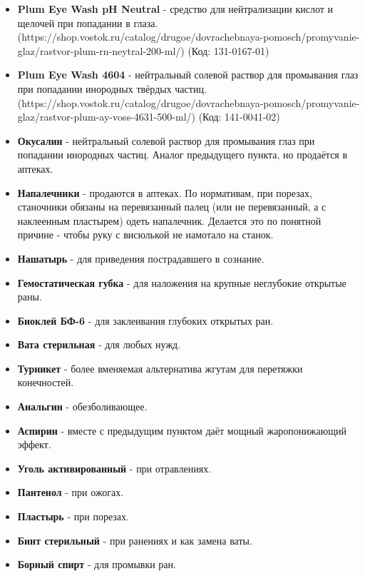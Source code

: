 \documentclass[a4paper,
	twoside,
	russian]{article}
\begin{document}
\begin{itemize}[noitemsep]
\item \textbf{Plum Eye Wash pH Neutral} - средство для нейтрализации
кислот и щелочей при попадании в глаза.
(https://shop.vostok.ru/catalog/drugoe/dovrachebnaya-pomosch/promyvanie-glaz/rastvor-plum-rn-neytral-200-ml/)
(Код: 131-0167-01)
\item \textbf{Plum Eye Wash 4604} - нейтральный солевой раствор для
промывания глаз при попадании инородных твёрдых частиц.
(https://shop.vostok.ru/catalog/drugoe/dovrachebnaya-pomosch/promyvanie-glaz/rastvor-plum-ay-voss-4631-500-ml/)
(Код: 141-0041-02)
\item \textbf{Окусалин} - нейтральный солевой раствор для промывания глаз
при попадании инородных частиц. Аналог предыдущего пункта, но продаётся
в аптеках.
\item \textbf{Напалечники} - продаются в аптеках. По нормативам, при порезах,
станочники обязаны на перевязанный палец (или не перевязанный, а с
наклеенным пластырем) одеть напалечник. Делается это по понятной
причине - чтобы руку с висюлькой не намотало на станок.
\item \textbf{Нашатырь} - для приведения пострадавшего в сознание.
\item \textbf{Гемостатическая губка} - для наложения на крупные неглубокие
открытые раны.
\item \textbf{Биоклей БФ-6} - для заклеивания глубоких открытых ран.
\item \textbf{Вата стерильная} - для любых нужд.
\item \textbf{Турникет} - более вменяемая альтернатива жгутам для
перетяжки конечностей.
\item \textbf{Анальгин} - обезболивающее.
\item \textbf{Аспирин} - вместе с предыдущим пунктом даёт мощный
жаропонижающий эффект.
\item \textbf{Уголь активированный} - при отравлениях.
\item \textbf{Пантенол} - при ожогах.
\item \textbf{Пластырь} - при порезах.
\item \textbf{Бинт стерильный} - при ранениях и как замена ваты.
\item \textbf{Борный спирт} - для промывки ран.
\end{itemize}
\end{document}
